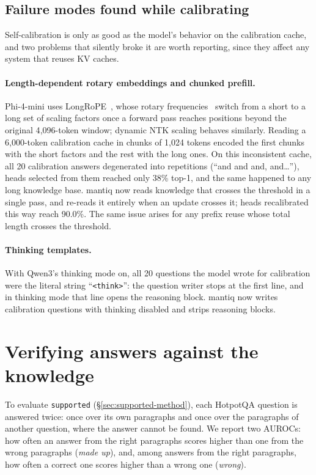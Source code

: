 \documentclass[11pt]{article}
\begin{document}
\subsection{Failure modes found while calibrating}
\label{sec:failures}

Self-calibration is only as good as the model's behavior on the calibration cache, and two problems that silently broke it are worth reporting, since they affect any system that reuses KV caches.

\paragraph{Length-dependent rotary embeddings and chunked prefill.} Phi-4-mini uses LongRoPE~\citep{ding2024longrope,phi3}, whose rotary frequencies~\citep{su2021roformer} switch from a short to a long set of scaling factors once a forward pass reaches positions beyond the original 4{,}096-token window; dynamic NTK scaling behaves similarly. Reading a 6{,}000-token calibration cache in chunks of 1{,}024 tokens encoded the first chunks with the short factors and the rest with the long ones. On this inconsistent cache, all 20 calibration answers degenerated into repetitions (``and and and, and\dots''), heads selected from them reached only 38\% top-1, and the same happened to any long knowledge base. mantiq now reads knowledge that crosses the threshold in a single pass, and re-reads it entirely when an update crosses it; heads recalibrated this way reach 90.0\%. The same issue arises for any prefix reuse whose total length crosses the threshold.

\paragraph{Thinking templates.} With Qwen3's thinking mode on, all 20 questions the model wrote for calibration were the literal string ``\texttt{<think>}'': the question writer stops at the first line, and in thinking mode that line opens the reasoning block. mantiq now writes calibration questions with thinking disabled and strips reasoning blocks.

\section{Verifying answers against the knowledge}
\label{sec:supported}

To evaluate \texttt{supported} (\S\ref{sec:supported-method}), each HotpotQA question is answered twice: once over its own paragraphs and once over the paragraphs of another question, where the answer cannot be found. We report two AUROCs: how often an answer from the right paragraphs scores higher than one from the wrong paragraphs (\emph{made up}), and, among answers from the right paragraphs, how often a correct one scores higher than a wrong one (\emph{wrong}).
\end{document}
